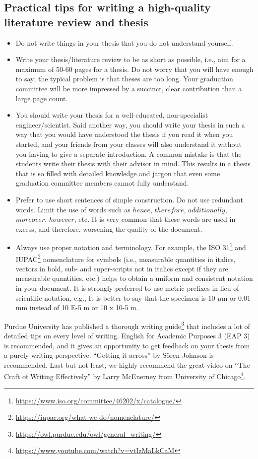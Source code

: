 \documentclass{article}
\begin{document}
\subsection{Practical tips for writing a high-quality literature review and thesis}
\begin{itemize}
    \item Do not write things in your thesis that you do not understand yourself.
    \item Write your thesis/literature review to be as short as possible, i.e., aim for a maximum of 50-60 pages for a thesis. Do not worry that you will have enough to say; the typical problem is that theses are too long. Your graduation committee will be more impressed by a succinct, clear contribution than a large page count.
    \item You should write your thesis for a well-educated, non-specialist engineer/scientist. Said another way, you should write your thesis in such a way that you would have understood the thesis if you read it when you started, and your friends from your classes will also understand it without you having to give a separate introduction. A common mistake is that the students write their thesis with their advisor in mind. This results in a thesis that is so filled with detailed knowledge and jargon that even some graduation committee members cannot fully understand.
    \item Prefer to use short sentences of simple construction. Do not use redundant words. Limit the use of words such as $hence$, $therefore$, $additionally$, $moreover$, $however$, etc. It is very common that these words are used in excess, and therefore, worsening the quality of the document. 
    \item Always use proper notation and terminology. For example, the ISO 31\footnote{\url{https://www.iso.org/committee/46202/x/catalogue/}} and IUPAC\footnote{\url{https://iupac.org/what-we-do/nomenclature/}} nomenclature for symbols (i.e., measurable quantities in italics, vectors in bold, sub- and super-scripts not in italics except if they are measurable quantities, etc.) helps to obtain a uniform and consistent notation in your document. It is strongly preferred to use metric prefixes in lieu of scientific notation, e.g., It is better to say that the specimen is 10 $\mu$m or 0.01 mm instead of 10 E-5 m or 10 x 10-5 m. 
\end{itemize}  

Purdue University has published a thorough writing guide\footnote{\url{https://owl.purdue.edu/owl/general_writing/}} that includes a lot of detailed tips on every level of writing. English for Academic Purposes 3 (EAP 3) is recommended, and it gives an opportunity to get feedback on your thesis from a purely writing perspective. “Getting it across” by Sören Johnson is recommended. Last but not least, we highly recommend the great video on “The Craft of Writing Effectively” by Larry McEnerney from University of Chicago\footnote{\url{https://www.youtube.com/watch?v=vtIzMaLkCaM}}.
    
\end{document}
